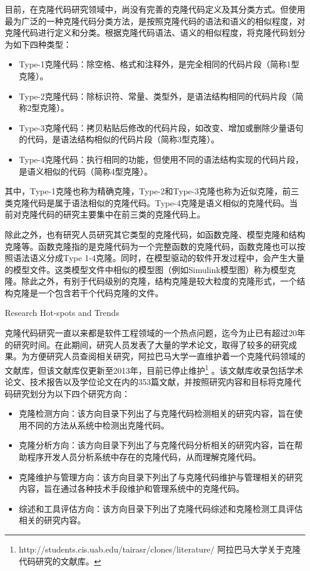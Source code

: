 目前，在克隆代码研究领域中，尚没有完善的克隆代码定义及其分类方式。但使用最为广泛的一种克隆代码分类方法，是按照克隆代码的语法和语义的相似程度，对克隆代码进行定义和分类\cite{koschke2007survey}。根据克隆代码语法、语义的相似程度，将克隆代码划分为如下四种类型：
\begin{itemize}
\item 
Type-1克隆代码：除空格、格式和注释外，是完全相同的代码片段（简称1型克隆）。
\item 
Type-2克隆代码：除标识符、常量、类型外，是语法结构相同的代码片段（简称2型克隆）。
\item 
Type-3克隆代码：拷贝粘贴后修改的代码片段，如改变、增加或删除少量语句的代码，是语法结构相似的代码片段（简称3型克隆）。
\item 
Type-4克隆代码：执行相同的功能，但使用不同的语法结构实现的代码片段，是语义相似的代码（简称4型克隆）。
\end{itemize}

其中，Type-1克隆也称为精确克隆，Type-2和Type-3克隆也称为近似克隆，前三类克隆代码是属于语法相似的克隆代码。Type-4克隆是语义相似的克隆代码。当前对克隆代码的研究主要集中在前三类的克隆代码上。


除此之外，也有研究人员研究其它类型的克隆代码，如函数克隆\cite{roy2008empirical}、模型克隆\cite{alalfi2012models}和结构克隆\cite{basit2009data}\cite{basit2005detecting}等。函数克隆指的是克隆代码为一个完整函数的克隆代码，函数克隆也可以按照语法语义分成Type 1-4克隆。同时，在模型驱动的软件开发过程中，会产生大量的模型文件。这类模型文件中相似的模型图（例如Simulink模型图）称为模型克隆。除此之外，有别于代码级别的克隆，结构克隆是较大粒度的克隆形式，一个结构克隆是一个包含若干个代码克隆的文件。

{Research Hot-spots and Trends}

克隆代码研究一直以来都是软件工程领域的一个热点问题，迄今为止已有超过20年的研究时间。在此期间，研究人员发表了大量的学术论文，取得了较多的研究成果。为方便研究人员查阅相关研究，阿拉巴马大学一直维护着一个克隆代码领域的文献库，但该文献库仅更新至2013年，目前已停止维护\footnote{ http://students.cis.uab.edu/tairasr/clones/literature/ 阿拉巴马大学关于克隆代码研究的文献库。} 。该文献库收录包括学术论文、技术报告以及学位论文在内的353篇文献，并按照研究内容和目标将克隆代码研究划分为以下四个研究方向：

\begin{itemize}
\item 
克隆检测方向：该方向目录下列出了与克隆代码检测相关的研究内容，旨在使用不同的方法从系统中检测出克隆代码。
\item 
克隆分析方向：该方向目录下列出了与克隆代码分析相关的研究内容，旨在帮助程序开发人员分析系统中存在的克隆代码，从而理解克隆代码。
\item 
克隆维护与管理方向：该方向目录下列出了与克隆代码维护与管理相关的研究内容，旨在通过各种技术手段维护和管理系统中的克隆代码。
\item 
综述和工具评估方向：该方向目录下列出了克隆代码综述和克隆检测工具评估相关的研究内容。
\end{itemize}

